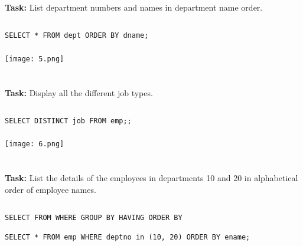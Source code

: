 \documentclass[12pt,a4paper]{article}
\begin{document}
\section{}
\textbf{Task:} List department numbers and names in department name order.

\subsection{}
\begin{lstlisting}
SELECT * FROM dept ORDER BY dname;

\end{lstlisting}

\subsubsection{}
\begin{center}
    \texttt{[image: 5.png]}
\end{center}


\section{}
\textbf{Task:} Display all the different job types.

\subsection{}
\begin{lstlisting}
SELECT DISTINCT job FROM emp;;

\end{lstlisting}

\subsubsection{}
\begin{center}
    \texttt{[image: 6.png]}
\end{center}


\section{}
\textbf{Task:} List the details of the employees in departments 10 and 20 in
alphabetical order of employee names.

\subsection{}
\begin{lstlisting}
SELECT FROM WHERE GROUP BY HAVING ORDER BY

SELECT * FROM emp WHERE deptno in (10, 20) ORDER BY ename;

\end{lstlisting}
\end{document}
